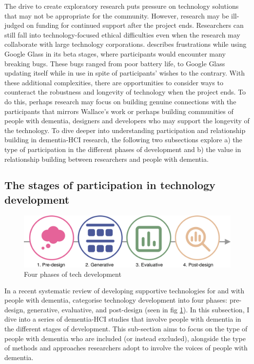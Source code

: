 The drive to create exploratory research puts pressure on technology solutions that may not be appropriate for the community. However, research may be ill-judged on funding for continued support after the project ends. Researchers can still fall into technology-focused ethical difficulties even when the research may collaborate with large technology corporations. \cite{vines_our_2017} describes frustrations while using Google Glass in its beta stages, where participants would encounter many breaking bugs. These bugs ranged from poor battery life, to Google Glass updating itself while in use in spite of participants' wishes to the contrary. With these additional complexities, there are opportunities to consider ways to counteract the robustness and longevity of technology when the project ends. To do this, perhaps research may focus on building genuine connections with the participants that mirrors Wallace's work or perhaps building communities of people with dementia, designers and developers who may support the longevity of the technology. To dive deeper into understanding participation and relationship building in dementia-HCI research, the following two subsections explore a) the type of participation in the different phases of development and b) the value in relationship building between researchers and people with dementia.

\subsection{The stages of participation in technology development}
\label{BL:StagesofTech}

\begin{figure}[htp]
    \centering
    \includegraphics[width=0.8\linewidth]{Images/ChapterTwo/PhasesOfTech.png}
    \caption{Four phases of tech development \citep{suijkerbuijk_active_2019}}
    \label{fig:PhasesOfTech}
\end{figure}
In a recent systematic review of developing supportive technologies for and with people with dementia, \cite{suijkerbuijk_active_2019} categorise technology development into four phases: pre-design, generative, evaluative, and post-design (seen in fig \ref{fig:PhasesOfTech}). In this subsection, I dive into a series of dementia-HCI studies that involve people with dementia in the different stages of development. This sub-section aims to focus on the type of people with dementia who are included (or instead excluded), alongside the type of methods and approaches researchers adopt to involve the voices of people with dementia.

